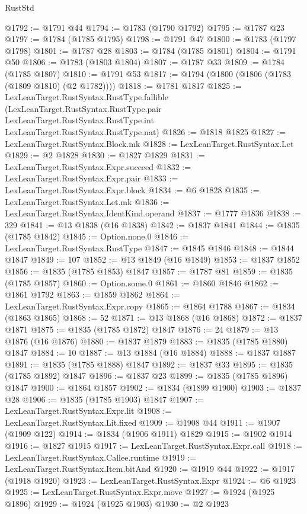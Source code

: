 \begin{lexlean}{RustStd}
\begin{coremodule}
@1792 := @1791 @44
@1794 := @1783 (@1790 @1792)
@1795 := @1787 @23
@1797 := @1784 (@1785 @1795)
@1798 := @1791 @47
@1800 := @1783 (@1797 @1798)
@1801 := @1787 @28
@1803 := @1784 (@1785 @1801)
@1804 := @1791 @50
@1806 := @1783 (@1803 @1804)
@1807 := @1787 @33
@1809 := @1784 (@1785 @1807)
@1810 := @1791 @53
@1817 := @1794 (@1800 (@1806 (@1783 (@1809 @1810) (@2 @1782))))
@1818 := @1781 @1817
@1825 := LexLeanTarget.RustSyntax.RustType.fallible
    (LexLeanTarget.RustSyntax.RustType.pair
      LexLeanTarget.RustSyntax.RustType.int
      LexLeanTarget.RustSyntax.RustType.nat)
@1826 := @1818 @1825
@1827 := LexLeanTarget.RustSyntax.Block.mk
@1828 := LexLeanTarget.RustSyntax.Let
@1829 := @2 @1828
@1830 := @1827 @1829
@1831 := LexLeanTarget.RustSyntax.Expr.succeed
@1832 := LexLeanTarget.RustSyntax.Expr.pair
@1833 := LexLeanTarget.RustSyntax.Expr.block
@1834 := @6 @1828
@1835 := LexLeanTarget.RustSyntax.Let.mk
@1836 := LexLeanTarget.RustSyntax.IdentKind.operand
@1837 := @1777 @1836
@1838 := 329
@1841 := @13 @1838 (@16 @1838)
@1842 := @1837 @1841
@1844 := @1835 (@1785 @1842)
@1845 := Option.none.{0}
@1846 := LexLeanTarget.RustSyntax.RustType
@1847 := @1845 @1846
@1848 := @1844 @1847
@1849 := 107
@1852 := @13 @1849 (@16 @1849)
@1853 := @1837 @1852
@1856 := @1835 (@1785 @1853) @1847
@1857 := @1787 @81
@1859 := @1835 (@1785 @1857)
@1860 := Option.some.{0}
@1861 := @1860 @1846
@1862 := @1861 @1792
@1863 := @1859 @1862
@1864 := LexLeanTarget.RustSyntax.Expr.copy
@1865 := @1864 @1788
@1867 := @1834 (@1863 @1865)
@1868 := 52
@1871 := @13 @1868 (@16 @1868)
@1872 := @1837 @1871
@1875 := @1835 (@1785 @1872) @1847
@1876 := 24
@1879 := @13 @1876 (@16 @1876)
@1880 := @1837 @1879
@1883 := @1835 (@1785 @1880) @1847
@1884 := 10
@1887 := @13 @1884 (@16 @1884)
@1888 := @1837 @1887
@1891 := @1835 (@1785 @1888) @1847
@1892 := @1837 @33
@1895 := @1835 (@1785 @1892) @1847
@1896 := @1837 @23
@1899 := @1835 (@1785 @1896) @1847
@1900 := @1864 @1857
@1902 := @1834 (@1899 @1900)
@1903 := @1837 @28
@1906 := @1835 (@1785 @1903) @1847
@1907 := LexLeanTarget.RustSyntax.Expr.lit
@1908 := LexLeanTarget.RustSyntax.Lit.fixed
@1909 := @1908 @44
@1911 := @1907 (@1909 @122)
@1914 := @1834 (@1906 @1911) @1829
@1915 := @1902 @1914
@1916 := @1827 @1915
@1917 := LexLeanTarget.RustSyntax.Expr.call
@1918 := LexLeanTarget.RustSyntax.Callee.runtime
@1919 := LexLeanTarget.RustSyntax.Item.bitAnd
@1920 := @1919 @44
@1922 := @1917 (@1918 @1920)
@1923 := LexLeanTarget.RustSyntax.Expr
@1924 := @6 @1923
@1925 := LexLeanTarget.RustSyntax.Expr.move
@1927 := @1924 (@1925 @1896)
@1929 := @1924 (@1925 @1903)
@1930 := @2 @1923

\end{coremodule}
\end{lexlean}
